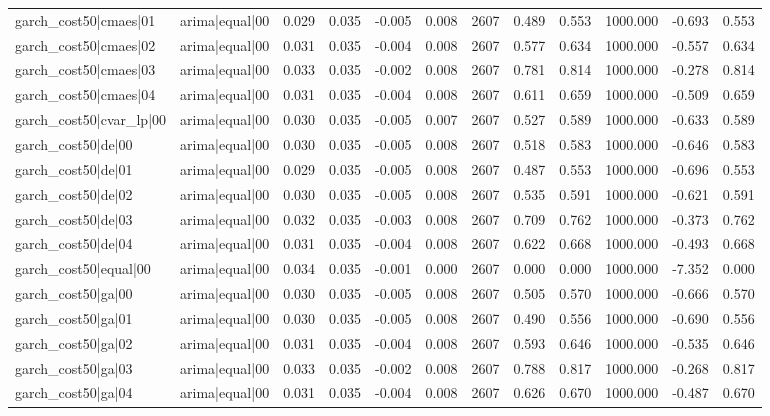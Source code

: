 \begin{table}
\begin{tabular}{llrrrrrrrrrr}
garch\_cost50|cmaes|01 & arima|equal|00 & 0.029 & 0.035 & -0.005 & 0.008 & 2607 & 0.489 & 0.553 & 1000.000 & -0.693 & 0.553 \\
garch\_cost50|cmaes|02 & arima|equal|00 & 0.031 & 0.035 & -0.004 & 0.008 & 2607 & 0.577 & 0.634 & 1000.000 & -0.557 & 0.634 \\
garch\_cost50|cmaes|03 & arima|equal|00 & 0.033 & 0.035 & -0.002 & 0.008 & 2607 & 0.781 & 0.814 & 1000.000 & -0.278 & 0.814 \\
garch\_cost50|cmaes|04 & arima|equal|00 & 0.031 & 0.035 & -0.004 & 0.008 & 2607 & 0.611 & 0.659 & 1000.000 & -0.509 & 0.659 \\
garch\_cost50|cvar\_lp|00 & arima|equal|00 & 0.030 & 0.035 & -0.005 & 0.007 & 2607 & 0.527 & 0.589 & 1000.000 & -0.633 & 0.589 \\
garch\_cost50|de|00 & arima|equal|00 & 0.030 & 0.035 & -0.005 & 0.008 & 2607 & 0.518 & 0.583 & 1000.000 & -0.646 & 0.583 \\
garch\_cost50|de|01 & arima|equal|00 & 0.029 & 0.035 & -0.005 & 0.008 & 2607 & 0.487 & 0.553 & 1000.000 & -0.696 & 0.553 \\
garch\_cost50|de|02 & arima|equal|00 & 0.030 & 0.035 & -0.005 & 0.008 & 2607 & 0.535 & 0.591 & 1000.000 & -0.621 & 0.591 \\
garch\_cost50|de|03 & arima|equal|00 & 0.032 & 0.035 & -0.003 & 0.008 & 2607 & 0.709 & 0.762 & 1000.000 & -0.373 & 0.762 \\
garch\_cost50|de|04 & arima|equal|00 & 0.031 & 0.035 & -0.004 & 0.008 & 2607 & 0.622 & 0.668 & 1000.000 & -0.493 & 0.668 \\
garch\_cost50|equal|00 & arima|equal|00 & 0.034 & 0.035 & -0.001 & 0.000 & 2607 & 0.000 & 0.000 & 1000.000 & -7.352 & 0.000 \\
garch\_cost50|ga|00 & arima|equal|00 & 0.030 & 0.035 & -0.005 & 0.008 & 2607 & 0.505 & 0.570 & 1000.000 & -0.666 & 0.570 \\
garch\_cost50|ga|01 & arima|equal|00 & 0.030 & 0.035 & -0.005 & 0.008 & 2607 & 0.490 & 0.556 & 1000.000 & -0.690 & 0.556 \\
garch\_cost50|ga|02 & arima|equal|00 & 0.031 & 0.035 & -0.004 & 0.008 & 2607 & 0.593 & 0.646 & 1000.000 & -0.535 & 0.646 \\
garch\_cost50|ga|03 & arima|equal|00 & 0.033 & 0.035 & -0.002 & 0.008 & 2607 & 0.788 & 0.817 & 1000.000 & -0.268 & 0.817 \\
garch\_cost50|ga|04 & arima|equal|00 & 0.031 & 0.035 & -0.004 & 0.008 & 2607 & 0.626 & 0.670 & 1000.000 & -0.487 & 0.670 \\

\end{tabular}
\end{table}
